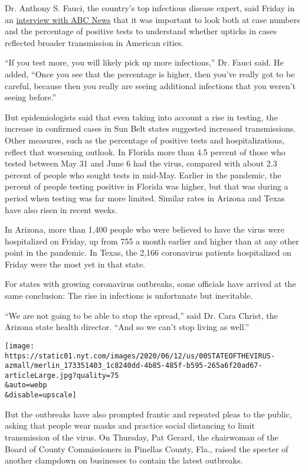 Dr. Anthony S. Fauci, the country's top infectious disease expert, said
Friday in an
\href{https://abcnews.go.com/Politics/fauci-tells-abcs-powerhouse-politics-attending-rallies-protests/story?id=71219338}{interview
with ABC News} that it was important to look both at case numbers and
the percentage of positive tests to understand whether upticks in cases
reflected broader transmission in American cities.

``If you test more, you will likely pick up more infections,'' Dr. Fauci
said. He added, ``Once you see that the percentage is higher, then
you've really got to be careful, because then you really are seeing
additional infections that you weren't seeing before.''

But epidemiologists said that even taking into account a rise in
testing, the increase in confirmed cases in Sun Belt states suggested
increased transmissions. Other measures, such as the percentage of
positive tests and hospitalizations, reflect that worsening outlook. In
Florida more than 4.5 percent of those who tested between May 31 and
June 6 had the virus, compared with about 2.3 percent of people who
sought tests in mid-May. Earlier in the pandemic, the percent of people
testing positive in Florida was higher, but that was during a period
when testing was far more limited. Similar rates in Arizona and Texas
have also risen in recent weeks.

In Arizona, more than 1,400 people who were believed to have the virus
were hospitalized on Friday, up from 755 a month earlier and higher than
at any other point in the pandemic. In Texas, the 2,166 coronavirus
patients hospitalized on Friday were the most yet in that state.

For states with growing coronavirus outbreaks, some officials have
arrived at the same conclusion: The rise in infections is unfortunate
but inevitable.

``We are not going to be able to stop the spread,'' said Dr. Cara
Christ, the Arizona state health director. ``And so we can't stop living
as well.''

\texttt{[image: https://static01.nyt.com/images/2020/06/12/us/00STATEOFTHEVIRUS-azmall/merlin\_173351403\_1c8240dd-4b85-485f-b595-265a6f20ad67-articleLarge.jpg?quality=75\\\&auto=webp\\\&disable=upscale]}

But the outbreaks have also prompted frantic and repeated pleas to the
public, asking that people wear masks and practice social distancing to
limit transmission of the virus. On Thursday, Pat Gerard, the chairwoman
of the Board of County Commissioners in Pinellas County, Fla., raised
the specter of another clampdown on businesses to contain the latest
outbreaks.

